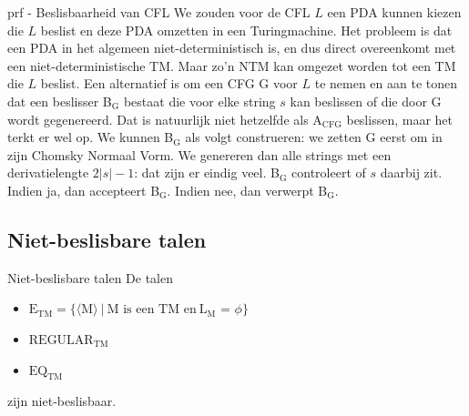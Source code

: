 \begin{prf}{prf - Beslisbaarheid van CFL}
    We zouden voor de CFL $L$ een PDA kunnen kiezen die $L$ beslist en deze PDA omzetten in een Turingmachine. Het probleem is dat een PDA in het algemeen niet-deterministisch is, en dus direct overeenkomt met een niet-deterministische TM\@. Maar zo'n NTM kan omgezet worden tot een TM die $L$ beslist. Een alternatief is om een CFG G voor $L$ te nemen en aan te tonen dat een beslisser B$_\text{G}$ bestaat die voor elke string $s$ kan beslissen of die door G wordt gegenereerd. Dat is natuurlijk niet hetzelfde als A$_{\text{CFG}}$ beslissen, maar het terkt er wel op. We kunnen B$_\text{G}$ als volgt construeren: we zetten G eerst om in zijn Chomsky Normaal Vorm. We genereren dan alle strings met een derivatielengte $2|s| - 1$: dat zijn er eindig veel. B$_\text{G}$ controleert of $s$ daarbij zit. Indien ja, dan accepteert B$_\text{G}$. Indien nee, dan verwerpt B$_\text{G}$.
\end{prf}

\subsection{Niet-beslisbare talen}

\vspace{0.5cm}

\begin{lem}{Niet-beslisbare talen}
    De talen
    \begin{itemize}
        \item 
            $\text{E}_{\text{TM}} = \{\langle \text{M} \rangle \ | \ \text{M is een TM en} \ \text{L$_{\text{M}}$ = $\phi$} \}$
        \item 
            $\text{REGULAR}_{\text{TM}}$
        \item 
            $\text{EQ}_{\text{TM}}$
    \end{itemize}
    zijn niet-beslisbaar.
\end{lem}

